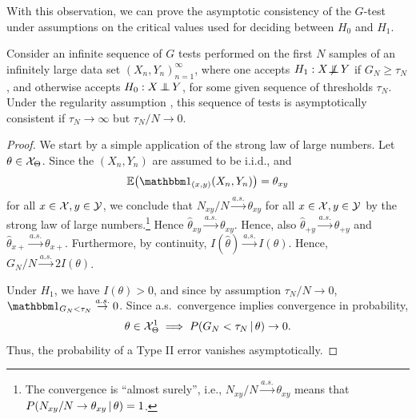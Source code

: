 With this observation, we can prove the asymptotic consistency of the $G$-test under assumptions on the critical values used
for deciding between $H_0$ and $H_1$. 
\begin{Cor}\label{cor:G_test_consistency}
Consider an infinite sequence of $G$ tests performed on the first $N$ samples of an infinitely large
data set $(X_n,Y_n)_{n=1}^\infty$, where one 
accepts $H_1 : X \operatorname*{\not\mkern-2mu\perp\mkern-11mu\perp} Y$ if $G_N \ge \tau_N$, and otherwise accepts $H_0 : X \operatorname*{\perp\mkern-11mu\perp} Y$, 
for some given sequence of thresholds $\tau_N$.
Under the regularity assumption , this sequence of tests is
asymptotically consistent if $\tau_N \to \infty$ but $\tau_N / N \to 0$.
\end{Cor}
\begin{proof}
We start by a simple application of the strong law of large numbers.
Let $\theta \in \mathcal{X}_\Theta$. Since the $(X_n,Y_n)$ are assumed to be i.i.d., and 
  $$\Exp \big(\I_{(x,y)}(X_n,Y_n)\big) = \theta_{xy}$$
for all $x \in \mathcal{X}, y \in \mathcal{Y}$,
we conclude that $N_{xy} / N \stackrel{a.s.}{\to} \theta_{xy}$ for all $x \in \mathcal{X}, y \in \mathcal{Y}$
by the strong law of large numbers.\footnote{The convergence is ``almost surely'', 
i.e., $N_{xy} / N \stackrel{a.s.}{\to} \theta_{xy}$ means that
$P(N_{xy} / N \to \theta_{xy} \operatorname*{|} \theta) = 1$.}
Hence $\hat\theta_{xy} \stackrel{a.s.}{\to} \theta_{xy}$. Hence, also
$\hat\theta_{+ y} \stackrel{a.s.}{\to} \theta_{+ y}$ and
$\hat\theta_{x +} \stackrel{a.s.}{\to} \theta_{x +}$.
Furthermore, by continuity, $I(\hat\theta) \stackrel{a.s.}{\to} I(\theta)$.
Hence, $G_N / N \stackrel{a.s.}{\to} 2I(\theta)$. 
  
Under $H_1$, we have $I(\theta) > 0$,
and since by assumption $\tau_N / N \to 0$, 
$\I_{G_N < \tau_N} \stackrel{a.s.}{\to} 0$. 
Since a.s.\ convergence implies convergence in probability,
  $$\theta \in \mathcal{X}_\Theta^1 \implies P(G_N < \tau_N \operatorname*{|} \theta) \to 0.$$
Thus, the probability of a Type II error vanishes asymptotically.


\end{proof}
